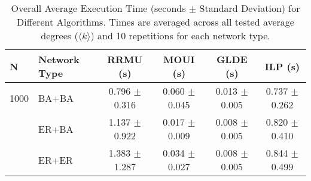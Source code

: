 \begin{table}[htbp]
\centering
\caption{Overall Average Execution Time (seconds $\pm$ Standard Deviation) for Different Algorithms. Times are averaged across all tested average degrees ($\langle k \rangle$) and 10 repetitions for each network type.}
\label{tab:execution_time_overall}
\begin{tabular}{l l c c c c}
\toprule
N & Network Type & RRMU (s) & MOUI (s) & GLDE (s) & ILP (s) \\
\midrule
1000 & BA+BA & 0.796 $\pm$ 0.316 & 0.060 $\pm$ 0.045 & 0.013 $\pm$ 0.005 & 0.737 $\pm$ 0.262 \\
 & ER+BA & 1.137 $\pm$ 0.922 & 0.017 $\pm$ 0.009 & 0.008 $\pm$ 0.005 & 0.820 $\pm$ 0.410 \\
 & ER+ER & 1.383 $\pm$ 1.287 & 0.034 $\pm$ 0.027 & 0.008 $\pm$ 0.005 & 0.844 $\pm$ 0.499 \\
\bottomrule
\end{tabular}%
\end{table}

